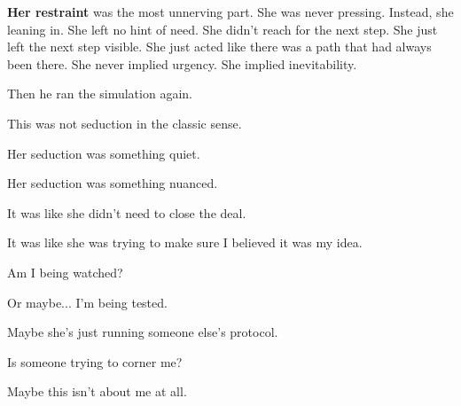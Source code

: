 \textbf{Her restraint} was the most unnerving part.
She was never pressing. Instead, she leaning in. She left no hint of need.
She didn’t reach for the next step. She just left the next step visible.
She just acted like there was a path that had always been there.
She never implied urgency.
She implied inevitability.

Then he ran the simulation again.

\begin{tcolorbox}[
    enhanced,
    sharp corners,
    boxrule=0pt,
    colback=gray!3,
    borderline west={2pt}{0pt}{gray!60}, %
    left=10pt,
    right=10pt,
    top=6pt,
    bottom=6pt,
    width=\linewidth,
    fontupper=\small\itshape
  ]
This was not seduction in the classic sense.

\medskip

Her seduction was something quiet.

\medskip

Her seduction was something nuanced.

\medskip

It was like she didn’t need to close the deal.

\medskip

It was like she was trying to make sure I believed it was my idea.

\medskip

Am I being watched?

\medskip

Or maybe... I'm being tested. 

\medskip

Maybe she's just running someone else's protocol.

\medskip

Is someone trying to corner me?

\medskip

Maybe this isn't about me at all.

\end{tcolorbox}

\medskip

